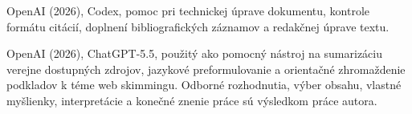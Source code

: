 \begin{trivlist}
\item OpenAI (2026), Codex, pomoc pri technickej úprave dokumentu, kontrole formátu citácií, doplnení bibliografických záznamov a redakčnej úprave textu.
\item OpenAI (2026), ChatGPT-5.5, použitý ako pomocný nástroj na sumarizáciu verejne dostupných zdrojov, jazykové preformulovanie a orientačné zhromaždenie podkladov k téme web skimmingu. Odborné rozhodnutia, výber obsahu, vlastné myšlienky, interpretácie a konečné znenie práce sú výsledkom práce autora.
\end{trivlist}

